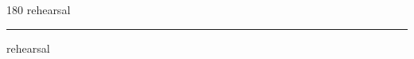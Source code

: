 
\begin{frame}
\begin{center}
\begin{turn}{180}
{\fontsize{2.5cm}{1em}\selectfont rehearsal}
\end{turn}
\vspace{1em}\par  
\hrule
\vspace{1em}\par  
{\fontsize{2.5cm}{1em}\selectfont rehearsal}
\end{center}
\end{frame}
